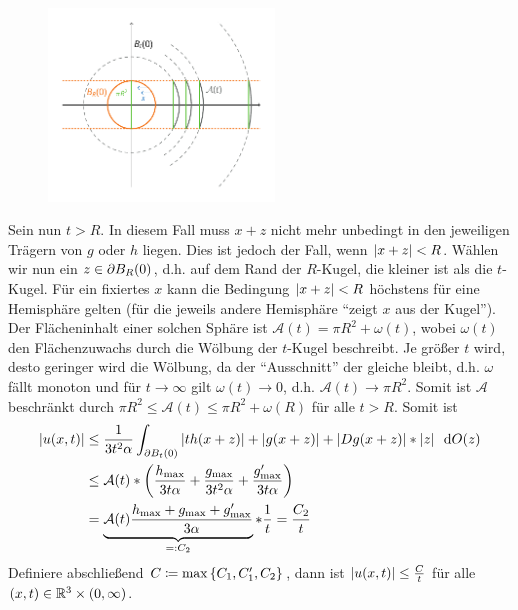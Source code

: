 \begin{exercisePage}
	\begin{figure}
		\includegraphics[width=6cm]{pde-uebungen-9-abb.pdf}
	\end{figure}
	Sein nun $t > R$. In diesem Fall muss $x+z$ nicht mehr unbedingt in den jeweiligen Trägern von $g$ oder $h$ liegen. Dies ist jedoch der Fall, wenn $\left| x+z \right| < R$. Wählen wir nun ein $z \in \partial B_R(0)$, d.h. auf dem Rand der $R$-Kugel, die kleiner ist als die $t$-Kugel. Für ein fixiertes $x$ kann die Bedingung $\left| x+z \right| < R$ höchstens für eine Hemisphäre gelten (für die jeweils andere Hemisphäre \enquote{zeigt $x$ aus der Kugel}). Der Flächeninhalt einer solchen Sphäre ist $\mathcal{A}(t) = \pi R^2 + \omega(t)$, wobei $\omega(t)$ den Flächenzuwachs durch die Wölbung der $t$-Kugel beschreibt. Je größer $t$ wird, desto geringer wird die Wölbung, da der \enquote{Ausschnitt} der gleiche bleibt, d.h. $\omega$ fällt monoton und für $t \to \infty$ gilt $\omega(t) \to 0$, d.h. $\mathcal{A}(t) \to \pi R^2$. Somit ist $\mathcal{A}$ beschränkt durch $\pi R^2 \le \mathcal{A}(t) \le \pi R^2 + \omega(R)$ für alle $t > R$. Somit ist
	\begin{align*}
		\left| u(x,t) \right| 
		&\le \frac{1}{3 t^2 \alpha} \int_{\partial B_t(0)} \left| t h(x+z) \right| + \left| g(x+z) \right| + \left| Dg(x+z) \right| * \left| z \right| \enskip \mathrm{d}O(z) \\
		&\le \mathcal{A}(t) * \left( \frac{h_{\max}}{3t\alpha} + \frac{g_{\max}}{3t^2\alpha} + \frac{g'_{\max}}{3t\alpha} \right) \\
		&= \underbrace{\mathcal{A}(t) \frac{h_{\max} + g_{\max} + g'_{\max}}{3\alpha}}_{\mathrel{=:} C_2} * \frac{1}{t} = \frac{C_2}{t}
	\end{align*}
	Definiere abschließend $C \coloneqq \max\left\{ C_1, C_1', C_2 \right\}$, dann ist $\left| u(x,t) \right| \le \frac{C}{t}$ für alle $(x,t) \in \mathbb{R}^3 \times (0, \infty)$.
\end{exercisePage}